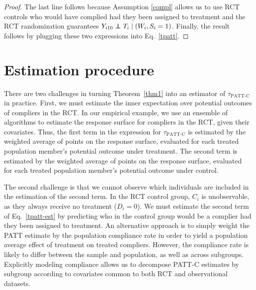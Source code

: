 \documentclass[hidelinks,12pt]{article}
\newcommand\independent{\protect\mathpalette{\protect\independenT}{\perp}}
\def\independenT#1#2{\mathrel{\rlap{$#1#2$}\mkern2mu{#1#2}}}
\begin{document}
{\begin{proof}
{\color{red}The last line follows because Assumption \ref{compl} allows us to use RCT controls who would have complied had they been assigned to treatment and the RCT randomization }guarantees $Y_{i10} \independent T_i \mid (W_i, S_i=1)$. Finally, the result follows by plugging these two expressions into Eq.~\eqref{tpatt}.
\end{proof}

\section{Estimation procedure}\label{estimation}
There are two challenges in turning Theorem~\ref{thm1} into an estimator of $\tau_{\text{PATT-C}}$ in practice. First, we must estimate the inner expectation over potential outcomes of compliers in the RCT. In our empirical example, we use an ensemble of algorithms \citep{van2007} to estimate the response surface for compliers in the RCT, given their covariates. Thus, the first term in the expression for $\tau_{\text{PATT-C}}$ is estimated by the weighted average of points on the response surface, evaluated for each treated population member's potential outcome under treatment. The second term is estimated by the weighted average of points on the response surface, evaluated for each treated population member's potential outcome under control.

The second challenge is that we cannot observe which individuals are included in the estimation of the second term. In the RCT control group, $C_i$ is unobservable, as they always receive no treatment ($D_i=0$). We must estimate the second term of Eq.~\eqref{tpatt-est} by predicting who in the control group would be a complier had they been assigned to treatment. {\color{red}An alternative approach is to simply weight the PATT estimate by the population compliance rate in order to yield a population average effect of treatment on treated compliers. However, the compliance rate is likely to differ between the sample and population, as well as across subgroups. Explicitly modeling compliance allows us to decompose PATT-C estimates by subgroup according to covariates common to both RCT and observational datasets.}

}
\end{document}
